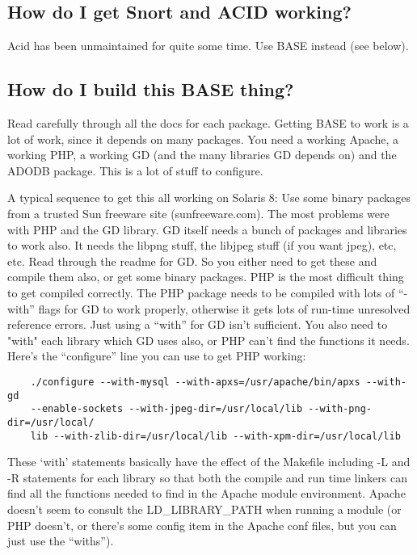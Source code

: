 \documentclass{article}
\begin{document}

\subsection{How do I get Snort and ACID working?}

Acid has been unmaintained for quite some time. Use BASE instead (see below).

\subsection{How do I build this BASE thing?}

Read carefully through all the docs for each package. Getting BASE to work is a
lot of work, since it depends on many packages. You need a working Apache, a
working PHP, a working GD (and the many libraries GD depends on) and the ADODB
package. This is a lot of stuff to configure.

A typical sequence to get this all working on Solaris 8: Use some binary
packages from a trusted Sun freeware site (sunfreeware.com). The most problems
were with PHP and the GD library. GD itself needs a bunch of packages and
libraries to work also. It needs the libpng stuff, the libjpeg stuff (if you
want jpeg), etc, etc. Read through the readme for GD. So you either need to get
these and compile them also, or get some binary packages. PHP is the most
difficult thing to get compiled correctly. The PHP package needs to be compiled
with lots of ``-with'' flags for GD to work properly, otherwise it gets lots of
run-time unresolved reference errors. Just using a ``with'' for GD isn't
sufficient. You also need to "with" each library which GD uses also, or PHP
can't find the functions it needs. Here's the ``configure'' line you can use to
get PHP working:
\begin{verbatim}
    ./configure --with-mysql --with-apxs=/usr/apache/bin/apxs --with-gd
    --enable-sockets --with-jpeg-dir=/usr/local/lib --with-png-dir=/usr/local/
    lib --with-zlib-dir=/usr/local/lib --with-xpm-dir=/usr/local/lib
\end{verbatim}
 These `with' statements basically have the effect of the Makefile including -L
and -R statements for each library so that both the compile and run time
linkers can find all the functions needed to find in the Apache module
environment. Apache doesn't seem to consult the LD\_LIBRARY\_PATH when running a
module (or PHP doesn't, or there's some config item in the Apache conf files,
but you can just use the ``withs'').
\end{document}
